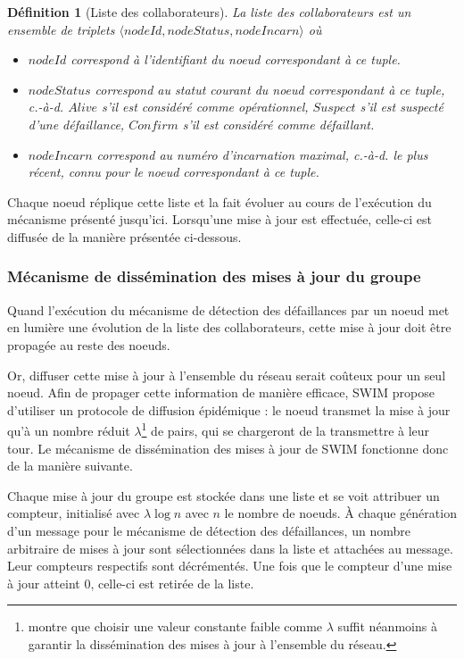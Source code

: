 \documentclass[12pt]{thesul}
\newtheorem{definition}{Définition}
\newcommand{\ie}{c.-à-d. }
\newcommand{\trm}[1]{\mathit{#1}}
\begin{document}
\begin{definition}[Liste des collaborateurs]
  \label{def:collaborator-list}
  La \emph{liste des collaborateurs} est un ensemble de triplets $\langle \trm{nodeId},\trm{nodeStatus},\trm{nodeIncarn} \rangle$ où
  \begin{itemize}
    \item $\trm{nodeId}$ correspond à l'identifiant du noeud correspondant à ce tuple.
    \item $\trm{nodeStatus}$ correspond au statut courant du noeud correspondant à ce tuple, \ie $\trm{Alive}$ s'il est considéré comme opérationnel, $\trm{Suspect}$ s'il est suspecté d'une défaillance, $\trm{Confirm}$ s'il est considéré comme défaillant.
    \item $\trm{nodeIncarn}$ correspond au numéro d'incarnation maximal, \ie le plus récent, connu pour le noeud correspondant à ce tuple.
  \end{itemize}
\end{definition}

Chaque noeud réplique cette liste et la fait évoluer au cours de l'exécution du mécanisme présenté jusqu'ici.
Lorsqu'une mise à jour est effectuée, celle-ci est diffusée de la manière présentée ci-dessous.

\subsubsection{Mécanisme de dissémination des mises à jour du groupe}

\label{sec:swim-update-dissemination}

Quand l'exécution du mécanisme de détection des défaillances par un noeud met en lumière une évolution de la liste des collaborateurs, cette mise à jour doit être propagée au reste des noeuds.

Or, diffuser cette mise à jour à l'ensemble du réseau serait coûteux pour un seul noeud.
Afin de propager cette information de manière efficace, SWIM propose d'utiliser un protocole de diffusion épidémique : le noeud transmet la mise à jour qu'à un nombre réduit $\lambda$\footnote{
  \cite{swim2002} montre que choisir une valeur constante faible comme $\lambda$ suffit néanmoins à garantir la dissémination des mises à jour à l'ensemble du réseau.
} de pairs, qui se chargeront de la transmettre à leur tour.
Le mécanisme de dissémination des mises à jour de SWIM fonctionne donc de la manière suivante.

Chaque mise à jour du groupe est stockée dans une liste et se voit attribuer un compteur, initialisé avec $\lambda \log{} n$ avec $n$ le nombre de noeuds.
À chaque génération d'un message pour le mécanisme de détection des défaillances, un nombre arbitraire de mises à jour sont sélectionnées dans la liste et attachées au message.
Leur compteurs respectifs sont décrémentés.
Une fois que le compteur d'une mise à jour atteint 0, celle-ci est retirée de la liste.
\end{document}
